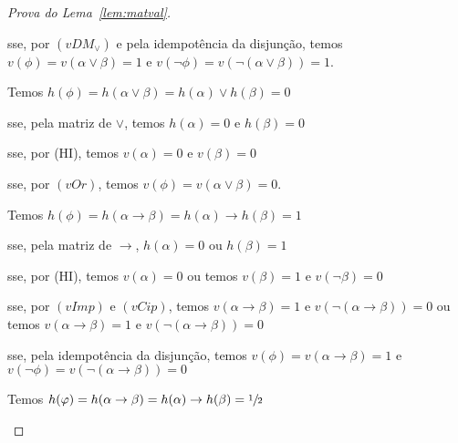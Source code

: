 \begin{proof}[Prova do Lema~\ref{lem:matval}]
\begin{provaporcasos}
\begin{provaporsubcasos}
                    \qquad{}sse, por $(vDM_{\lor})$ e pela idempotência da disjunção, temos $v(\phi) = v(\alpha \lor \beta) = 1$ e $v(\neg \phi) = v(\neg(\alpha \lor \beta)) = 1$.


                    Temos $h(\phi) = h(\alpha \lor \beta) = h(\alpha) \lor h(\beta) = 0$

                    \qquad{}sse, pela matriz de $\lor$, temos $h(\alpha) = 0$ e $h(\beta) = 0$

                    \qquad{}sse, por (HI), temos $v(\alpha) = 0$ e $v(\beta) = 0$

                    \qquad{}sse, por $(vOr)$, temos $v(\phi) = v(\alpha \lor \beta) = 0$.

            \end{provaporsubcasos}


            \begin{provaporsubcasos}

                    Temos $h(\phi) = h(\alpha \to \beta) = h(\alpha) \to h(\beta) = 1$

                    \qquad{}sse, pela matriz de $\to$, $h(\alpha) = 0$ ou $h(\beta) = 1$

                    \qquad{}sse, por (HI), temos $v(\alpha) = 0$ ou temos $v(\beta) = 1$ e $v(\neg \beta) = 0$

                    \qquad{}sse, por $(vImp)$ e $(vCip)$, temos $v(\alpha \to \beta) = 1$ e $v(\neg (\alpha \to \beta)) = 0$ ou temos $v(\alpha \to \beta) = 1$ e $v(\neg (\alpha \to \beta)) = 0$

                    \qquad{}sse, pela idempotência da disjunção, temos $v(\phi) = v(\alpha \to \beta) = 1$ e $v(\neg \phi) = v(\neg (\alpha \to \beta)) = 0$


                    Temos $h(\varphi) = h(\alpha \to \beta) = h(\alpha) \to h(\beta) = \sfrac{1}{2}{}$


\end{provaporsubcasos}
\end{provaporcasos}
\end{proof}
